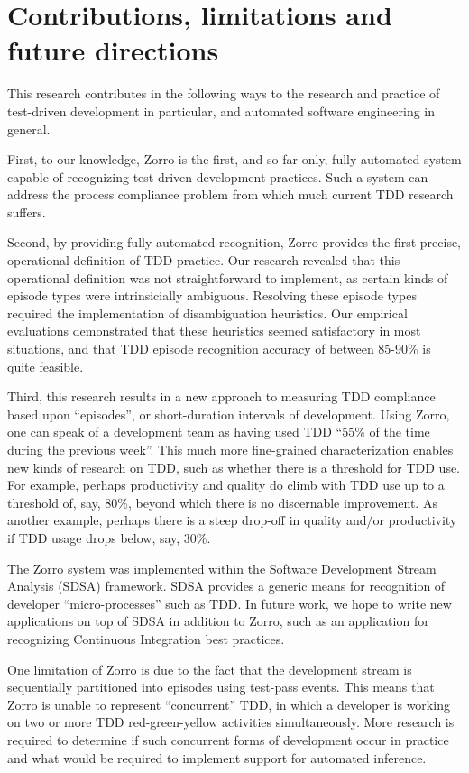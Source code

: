 \documentclass[smallextended]{svjour3}     %
\begin{document}
\section{Contributions, limitations and future directions}
\label{sec:conclusions}

This research contributes in the following ways to the research and
practice of test-driven development in particular, and automated software
engineering in general.

First, to our knowledge, Zorro is the first, and so far only,
fully-automated system capable of recognizing test-driven development
practices.  Such a system can address the 
process compliance problem from which much current TDD research suffers. 

Second, by providing fully automated recognition, Zorro provides the first
precise, operational definition of TDD practice.  Our research revealed
that this operational definition was not straightforward to implement, as
certain kinds of episode types were intrinsicially ambiguous.  Resolving
these episode types required the implementation of disambiguation
heuristics. Our empirical evaluations demonstrated that these heuristics
seemed satisfactory in most situations, and that TDD episode recognition
accuracy of between 85-90\% is quite feasible.

Third, this research results in a new approach to measuring TDD compliance
based upon ``episodes'', or short-duration intervals of development.  Using
Zorro, one can speak of a development team as having used TDD ``55\% of the
time during the previous week''.  This much more fine-grained
characterization enables new kinds of research on TDD, such as whether
there is a threshold for TDD use.  For example, perhaps productivity and
quality do climb with TDD use up to a threshold of, say, 80\%, beyond which
there is no discernable improvement.  As another example, perhaps there is
a steep drop-off in quality and/or productivity if TDD usage drops below,
say, 30\%.

The Zorro system was implemented within the Software Development
Stream Analysis (SDSA) framework.  SDSA provides a generic means for
recognition of developer ``micro-processes'' such as TDD.  In future work,
we hope to write new applications on top of SDSA in addition to Zorro, such
as an application for recognizing Continuous Integration best practices.

One limitation of Zorro is due to the fact that the development stream is sequentially partitioned into episodes using test-pass events.  This means that Zorro is unable to represent ``concurrent'' TDD, in which a developer is working on two or more TDD red-green-yellow activities simultaneously.  More research is required to determine if such concurrent forms of development occur in practice and what would be required to implement support for automated inference. 
\end{document}
